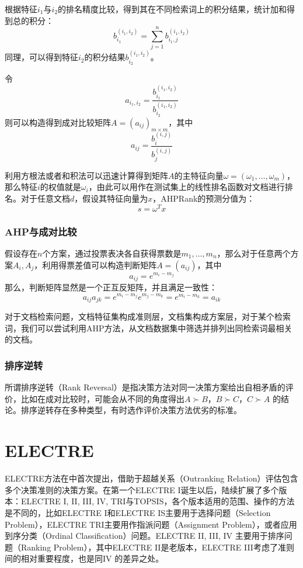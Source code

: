 根据特征$i_1$与$i_2$的排名精度比较，得到其在不同检索词上的积分结果，统计加和得到总的积分：
\begin{equation}
  b_{i_1}^{(i_1,i_2)} = \sum\limits_{j=1}^n b_{i_1, j}^{(i_1,i_2)}
\end{equation}
同理，可以得到特征$i_2$的积分结果$b_{i_2}^{(i_1,i_2)}$。

令
\begin{equation}
  a_{i_1,i_2} = \frac{b_{i_1}^{(i_1,i_2)}}{b_{i_2}^{(i_1,i_2)}}
\end{equation}
则可以构造得到成对比较矩阵$A = (a_{ij})_{m\times m}$，其中
\begin{equation}
  a_{ij} = \frac{b_i^{(i,j)}}{b_j^{(i,j)}}
\end{equation}

利用方根法或者和积法可以迅速计算得到矩阵$A$的主特征向量$\omega = (\omega_1,\ldots, \omega_m)$，那么特征$i$的权值就是$\omega_i$，由此可以用作在测试集上的线性排名函数对文档进行排名。对于任意文档$d$，假设其特征向量为$x$，AHPRank的预测分值为：
\[
 s = \omega^T x
\]

\subsection{AHP与成对比较}
假设存在$n$个方案，通过投票表决各自获得票数是$m_1,\ldots, m_n$，那么对于任意两个方案$A_i, A_j$，利用得票差值可以构造判断矩阵$A=(a_{ij})$，其中
\[
    a_{ij} = e^{m_i - m_j}
\]
那么，判断矩阵显然是一个正互反矩阵，并且满足一致性：
\[
    a_{ij} a_{jk} = e^{m_i - m_j}  e^{m_j - m_k} = e^{m_i - m_k} = a_{ik}
\]

对于文档检索问题，文档特征集构成准则层，文档集构成方案层，对于某个检索词，我们可以尝试利用AHP方法，从文档数据集中筛选并排列出同检索词最相关的文档。

\subsection{排序逆转}
所谓排序逆转（Rank Reversal）是指决策方法对同一决策方案给出自相矛盾的评价，比如在成对比较时，可能会从不同的角度得出$A\succ B$，$B\succ C$，$C\succ A$ 的结论。排序逆转存在多种类型，有时选作评价决策方法优劣的标准。

\chapter{ELECTRE}
ELECTRE方法在\cite{benayoun1966manual}中首次提出，借助于超越关系（Outranking Relation）评估包含多个决策准则的决策方案。在第一个ELECTRE I\cite{roy1968classement}诞生以后，陆续扩展了多个版本：ELECTRE I, II, III, IV, TRI与TOPSIS\cite{hwang1981multiple}，各个版本适用的范围、操作的方法是不同的，比如ELECTRE I\cite{roy1968classement}和ELECTRE IS主要用于选择问题（Selection Problem），ELECTRE TRI主要用作指派问题（Assignment Problem），或者应用到序分类（Ordinal Classification）问题。ELECTRE II, III, IV 主要用于排序问题（Ranking Problem），其中ELECTRE II\cite{roy1971methode,bertier1973methode}是老版本，ELECTRE III\cite{roy1978electre}考虑了准则间的相对重要程度，也是同IV 的差异之处。

